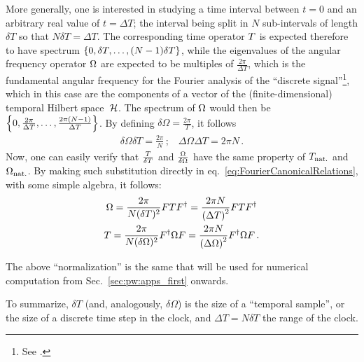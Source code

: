 More generally, one is interested in studying a time interval
between $t=0$ and an arbitrary real value of $t = \Delta{T}$;
the interval being split in $N$ sub-intervals of length $\delta{T}$
so that $N\delta{T} = \Delta{T}$.
The corresponding time operator ${T}$
is expected therefore to have spectrum $\left\{0, \delta{T}, \dots, (N-1)\delta{T}\right\}$,
while the eigenvalues of the angular frequency operator ${\Omega}$
are expected to be multiples of
$\frac{2\pi}{\Delta{T}}$, which is
the fundamental
angular frequency for the Fourier analysis of the ``discrete signal''\footnote{
  See
  \cite[chapters
    ``The Discrete Fourier Transform'' and
    ``Fourier Analysis of Signals Using the Discrete Fourier Transform'']{Oppenheim:Int1,Oppenheim:Int3}.
},
which in this case are the components of a vector of the (finite-dimensional) temporal Hilbert space~$\mathcal{H}$.
The spectrum of ${\Omega}$ would then be $\left\{0, \frac{2\pi}{\Delta{T}}, \dots, \frac{2\pi(N-1)}{\Delta{T}}\right\}$.
By defining $\delta{\Omega} = \frac{2\pi}{T}$,
it follows
\begin{gather}
  \delta\Omega \delta T = \frac{2\pi}{N} \, \text{;} \quad
  \Delta\Omega \Delta T = 2\pi N \, \text{.}
\end{gather}
Now, one can easily verify that $\frac{{T}}{\delta{T}}$ and $\frac{{\Omega}}{\delta{\Omega}}$
have the same property of ${T}_{\mathrm{nat.}}$ and ${\Omega}_{\mathrm{nat.}}$.  
By making such substitution directly in eq.~\eqref{eq:FourierCanonicalRelations},
with some simple algebra, it follows:
\begin{gather}
  \label{eq:SI_Fourier:Omega}
    {\Omega} = \frac{2\pi}{N(\delta T)^2} F {T} F^{\dagger} = \frac{2\pi N}{\qty(\Delta T)^2} F {T} F^{\dagger} \\
  \label{eq:SI_Fourier:T}
    {T} = \frac{2\pi}{N(\delta\Omega)^2} F^{\dagger} {\Omega} F = \frac{2\pi N}{\qty(\Delta\Omega)^2} F^{\dagger} {\Omega} F
  \, \text{.}
\end{gather}

The above ``normalization'' is the same that will be used
for numerical computation from Sec.~\ref{sec:pw:apps_first} onwards.

To summarize, $\delta T$ (and, analogously, $\delta\Omega$)
is the size of a ``temporal sample'', or the size of a discrete
time step in the clock, and $\Delta T = N\delta T$ the range of the clock.

